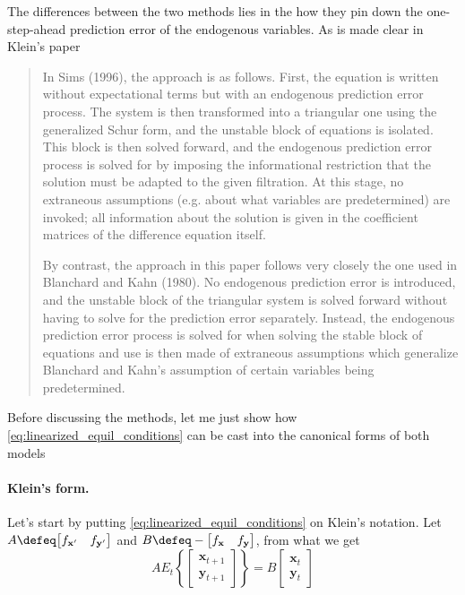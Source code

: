 \documentclass[a4paper,10pt]{article}  %
\begin{document}
The differences between the two methods lies in the how they pin down the one-step-ahead prediction error of the
endogenous variables. As is made clear in Klein's paper
\begin{quote}\small
   In Sims (1996), the approach is as follows. First, the equation is written without expectational terms but with an endogenous
   prediction error process. The system is then transformed into a triangular one using the generalized Schur form, and the unstable
   block of equations is isolated. This block is then solved forward, and the endogenous prediction error process is solved for by
   imposing the informational restriction that the solution must be adapted to the given filtration. At this stage, no extraneous
   assumptions (e.g. about what variables are predetermined) are invoked; all information about the solution is given in the
   coefficient matrices of the difference equation itself.

   By contrast, the approach in this paper follows very closely the one used in Blanchard and Kahn (1980). No endogenous prediction
   error is introduced, and the unstable block of the triangular system is solved forward without having to solve for the prediction
   error separately. Instead, the endogenous prediction error process is solved for when solving the stable block of equations and use
   is then made of extraneous assumptions which generalize Blanchard and Kahn's assumption of certain variables being predetermined.
\end{quote}\normalsize

Before discussing the methods, let me just show how \eqref{eq:linearized_equil_conditions} can be cast into the canonical forms of both models

\paragraph{\normalfont\bf Klein's form.} %
\label{par:klein}
Let's start by putting \eqref{eq:linearized_equil_conditions} on Klein's notation. Let $ A \defeq \big[f_{ \mathbf{x}' }
\quad f_{ \mathbf{y}' } \big] $  and $ B \defeq - \big[f_{ \mathbf{x} } \quad  f_{ \mathbf{y} } \big] $, from what we
get
\begin{equation}
   \label{eq:klein}
   A E_t \left\{ 
   \begin{bmatrix}
      \mathbf{x}_{t+1} \\ \mathbf{y}_{t+1}
   \end{bmatrix}
   \right\} = 
   B 
   \begin{bmatrix}
      \mathbf{x}_{t} \\ \mathbf{y}_t 
   \end{bmatrix}
\end{equation}
\end{document}

